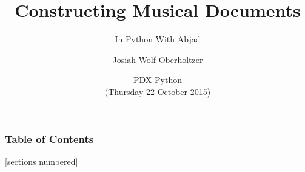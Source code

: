 \documentclass[10pt]{beamer}
\title{Constructing Musical Documents}
\subtitle{In Python With Abjad}
\author{
    Josiah Wolf Oberholtzer %
}
\date[]{
    PDX Python\protect\\
    (Thursday 22 October 2015)
}
\begin{document}
\maketitle



\begin{frame}
    \frametitle{Table of Contents}
    [sections numbered]
    \tableofcontents[hideallsubsections]
\end{frame}









\end{document}
